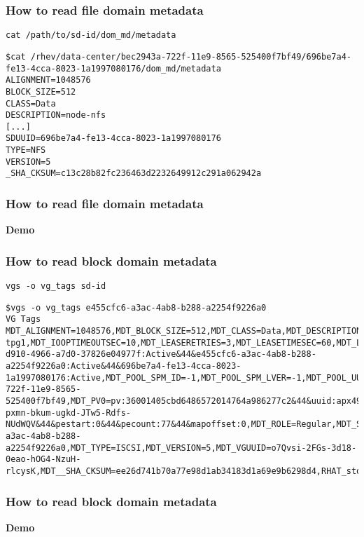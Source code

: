 \documentclass[10pt,utf8]{beamer}
\begin{document}
\begin{frame}[fragile]
	\frametitle{How to read file domain metadata}
	\begin{lstlisting}[style=Bash]
		cat /path/to/sd-id/dom_md/metadata
	\end{lstlisting}
	\begin{lstlisting}[style=Bash]
$cat /rhev/data-center/bec2943a-722f-11e9-8565-525400f7bf49/696be7a4-fe13-4cca-8023-1a1997080176/dom_md/metadata
ALIGNMENT=1048576
BLOCK_SIZE=512
CLASS=Data
DESCRIPTION=node-nfs
[...]
SDUUID=696be7a4-fe13-4cca-8023-1a1997080176
TYPE=NFS
VERSION=5
_SHA_CKSUM=c13c28b82fc236463d2232649912c291a062942a
	\end{lstlisting}
\end{frame}

\begin{frame}
	\frametitle{How to read file domain metadata}
	\centering
	\huge{\textbf{Demo}}
\end{frame}

\begin{frame}[fragile]
	\frametitle{How to read block domain metadata}
	\begin{lstlisting}[style=Bash]
		vgs -o vg_tags sd-id
	\end{lstlisting}
	\begin{lstlisting}[style=Bash]
$vgs -o vg_tags e455cfc6-a3ac-4ab8-b288-a2254f9226a0
VG Tags
MDT_ALIGNMENT=1048576,MDT_BLOCK_SIZE=512,MDT_CLASS=Data,MDT_DESCRIPTION=iscsi-tpg1,MDT_IOOPTIMEOUTSEC=10,MDT_LEASERETRIES=3,MDT_LEASETIMESEC=60,MDT_LOCKPOLICY=,MDT_LOCKRENEWALINTERVALSEC=5,MDT_MASTER_VERSION=872,MDT_POOL_DESCRIPTION=Default,MDT_POOL_DOMAINS=23393f78-d910-4966-a7d0-37826e04977f:Active&44&e455cfc6-a3ac-4ab8-b288-a2254f9226a0:Active&44&696be7a4-fe13-4cca-8023-1a1997080176:Active,MDT_POOL_SPM_ID=-1,MDT_POOL_SPM_LVER=-1,MDT_POOL_UUID=bec2943a-722f-11e9-8565-525400f7bf49,MDT_PV0=pv:36001405cbd6486572014764a986277c2&44&uuid:apx49E-pxmn-bkum-ugkd-JTw5-Rdfs-NUdWQV&44&pestart:0&44&pecount:77&44&mapoffset:0,MDT_ROLE=Regular,MDT_SDUUID=e455cfc6-a3ac-4ab8-b288-a2254f9226a0,MDT_TYPE=ISCSI,MDT_VERSION=5,MDT_VGUUID=o7Qvsi-2FGs-3d18-0eao-hOG4-NzuH-rlcysK,MDT__SHA_CKSUM=ee26d741b70a77e98d1ab34183d1a69e9b6298d4,RHAT_storage_domain
	\end{lstlisting}
\end{frame}

\begin{frame}
  \frametitle{How to read block domain metadata}
	\centering
	\huge{\textbf{Demo}}
\end{frame}
\end{document}
